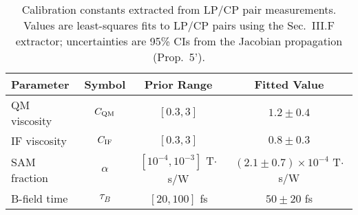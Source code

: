 \begin{table}[htbp]
\centering
\caption{Calibration constants extracted from LP/CP pair measurements. Values are least-squares fits to LP/CP pairs using the Sec.~III.F extractor; uncertainties are 95\% CIs from the Jacobian propagation (Prop.~5').}
\label{tab:calibration}
\begin{tabular}{lccc}
\hline
Parameter & Symbol & Prior Range & Fitted Value \\
\hline
QM viscosity & $C_{\rm QM}$ & $[0.3, 3]$ & $1.2 \pm 0.4$ \\
IF viscosity & $C_{\rm IF}$ & $[0.3, 3]$ & $0.8 \pm 0.3$ \\
SAM fraction & $\alpha$ & $[10^{-4}, 10^{-3}]$ T$\cdot$s/W & $(2.1 \pm 0.7) \times 10^{-4}$ T$\cdot$s/W \\
B-field time & $\tau_B$ & $[20, 100]$ fs & $50 \pm 20$ fs \\
\hline
\end{tabular}
\end{table}